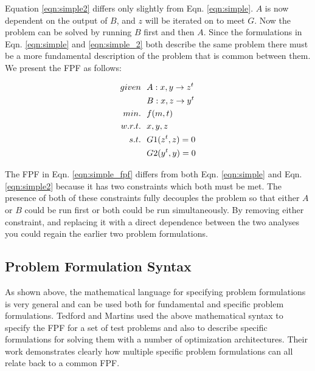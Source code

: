     Equation \ref{eqn:simple2} differs only slightly from Eqn. \ref{eqn:simple}. $A$ is now dependent on the output of $B$, 
    and $z$ will be iterated on to meet $G$. Now the problem can be solved by running $B$ first and then $A$.
    Since the formulations in Eqn. \ref{eqn:simple} and \ref{eqn:simple_2} both describe the same problem 
    there must be a more fundamental description of the problem that is common between them. We present the FPF as follows: 

    \begin{align}
        given & \ \ A: {x,y} \rightarrow {z^t}
        \\      & \ \ B: {x,z} \rightarrow {y^t}
        \\min. &\ \ f(m,t) \notag
        \\w.r.t. & \ \ x,y,z \notag
        \\s.t. & \ \ G1(z^t,z) = 0 \notag
        \\     & \ \ G2(y^t,y) = 0
        \label{eqn:simple_fpf}
    \end{align}

    The FPF in Eqn. \ref{eqn:simple_fpf} differs from both Eqn. \ref{eqn:simple} and Eqn. \ref{eqn:simple2} because it has 
    two constraints which both must be met. The presence of both of these constraints fully decouples the problem so that 
    either $A$ or $B$ could be run first or both could be run simultaneously. By removing either constraint, and replacing 
    it with a direct dependence between the two analyses you could regain the earlier two problem formulations. 

    \subsection{Problem Formulation Syntax}

    As shown above, the mathematical language for specifying problem formulations is very general and can be used both for 
    fundamental and specific problem formulations. Tedford and Martins used the above mathematical syntax to specify the 
    FPF for a set of test problems and also to describe specific formulations for solving them with a 
    number of optimization architectures\cite{Tedford2009}. Their work demonstrates clearly how multiple specific 
    problem formulations can all relate back to a common FPF. 
    
